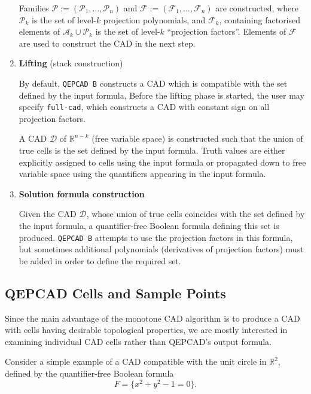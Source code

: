 \documentclass[
]{book}
\theoremstyle{definition}
\theoremstyle{definition}
\theoremstyle{definition}
\theoremstyle{definition}
\theoremstyle{remark}
\begin{document}
\begin{enumerate}
  Families \(\mathcal{P} := (\mathcal{P}_1,\ldots,\mathcal{P}_n)\) and \(\mathcal{F} := (\mathcal{F}_1,\ldots,\mathcal{F}_n)\) are constructed, where \(\mathcal{P}_k\) is the set of level-\(k\) projection polynomials, and \(\mathcal{F}_k\), containing factorised elements of \(\mathcal{A}_k \cup \mathcal{P}_k\) is the set of level-\(k\) ``projection factors''. Elements of \(\mathcal{F}\) are used to construct the CAD in the next step.
\item
  \textbf{Lifting} (stack construction)

  By default, \texttt{QEPCAD\ B} constructs a CAD which is compatible with the set defined by the input formula,
  Before the lifting phase is started, the user may specify \texttt{full-cad}, which constructs a CAD with constant sign on all projection factors.

  A CAD \(\mathcal{D}\) of \(\mathbb{R}^{n-k}\) (free variable space) is constructed such that the union of true cells is the set defined by the input formula.
  Truth values are either explicitly assigned to cells using the input formula or propagated down to free variable space using the quantifiers appearing in the input formula.
\item
  \textbf{Solution formula construction}

  Given the CAD \(\mathcal{D}\), whose union of true cells coincides with the set defined by the input formula, a quantifier-free Boolean formula defining this set is produced. \texttt{QEPCAD\ B} attempts to use the projection factors in this formula, but sometimes additional polynomials (derivatives of projection factors) must be added in order to define the required set.
\end{enumerate}

\hypertarget{qepcad-cells-and-sample-points}{%
\subsection{QEPCAD Cells and Sample Points}\label{qepcad-cells-and-sample-points}}

Since the main advantage of the monotone CAD algorithm is to produce a CAD with cells having desirable topological properties, we are mostly interested in examining individual CAD cells rather than QEPCAD's output formula.

Consider a simple example of a CAD compatible with the unit circle in \(\mathbb{R}^2\), defined by the quantifier-free Boolean formula
\[
F = \{ x^2 + y^2 - 1 = 0 \}.
\]
\end{document}
